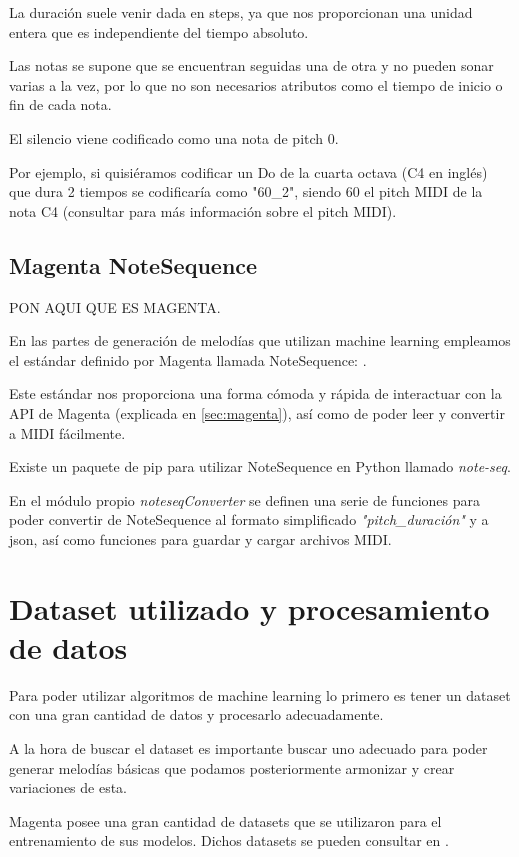         La duración suele venir dada en steps, ya que nos proporcionan una unidad entera que es independiente del tiempo absoluto.

        Las notas se supone que se encuentran seguidas una de otra y no pueden sonar varias a la vez, por lo que no son necesarios atributos como el tiempo de inicio o fin de cada nota.

        El silencio viene codificado como una nota de pitch 0.

        Por ejemplo, si quisiéramos codificar un Do de la cuarta octava (C4 en inglés) que dura 2 tiempos se codificaría como "60\_2", siendo 60 el pitch MIDI de la nota C4 (consultar \cite{MIDIPitch} para más información sobre el pitch MIDI).

    \subsection{Magenta NoteSequence}
    \label{subsec:note-seq}

    PON AQUI QUE ES MAGENTA.
    
    En las partes de generación de melodías que utilizan machine learning empleamos el estándar definido por Magenta llamada NoteSequence: \cite{note-seq}. 

    Este estándar nos proporciona una forma cómoda y rápida de interactuar con la API de Magenta (explicada en \ref{sec:magenta}), así como de poder leer y convertir a MIDI fácilmente.

    Existe un paquete de pip para utilizar NoteSequence en Python llamado \textit{note-seq}.

    En el módulo propio \textit{noteseqConverter} se definen una serie de funciones para poder convertir de NoteSequence al formato simplificado \textit{"pitch\_duración"} y a json, así como funciones para guardar y cargar archivos MIDI.

\section{Dataset utilizado y procesamiento de datos}
\label{sec:dataset}
Para poder utilizar algoritmos de machine learning lo primero es tener un dataset con una gran cantidad de datos y procesarlo adecuadamente.

A la hora de buscar el dataset es importante buscar uno adecuado para poder generar melodías básicas que podamos posteriormente armonizar y crear variaciones de esta.

Magenta posee una gran cantidad de datasets que se utilizaron para el entrenamiento de sus modelos. Dichos datasets se pueden consultar en \cite{MagentaDatasets}.

